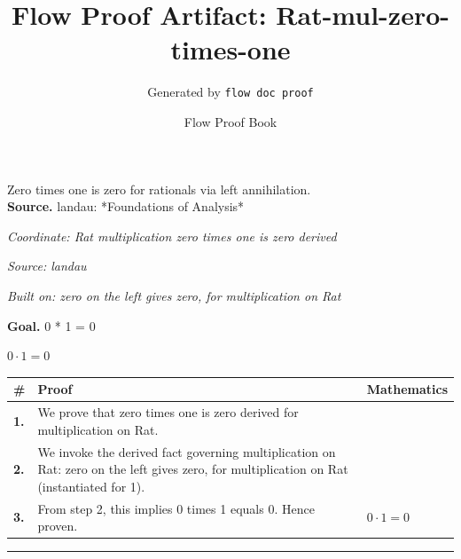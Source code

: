 \documentclass[11pt]{article}
\title{Flow Proof Artifact: Rat-mul-zero-times-one}
\author{Generated by \texttt{flow doc proof}}
\date{Flow Proof Book}
\theoremstyle{definition}
\begin{document}
\maketitle
Zero times one is zero for rationals via left annihilation.\\[0.5em]
\textbf{Source.} landau: *Foundations of Analysis*\\[0.5em]
\bigskip
{}\par
\smallskip\noindent\textit{Coordinate: Rat \cdot multiplication \cdot zero times one is zero derived}\par
\smallskip\noindent\textit{Source: landau}\par
\smallskip\noindent\textit{Built on: zero on the left gives zero, for multiplication on Rat}\par
\medskip
\noindent\textbf{Goal.} 0 * 1 = 0\par
\noindent$\displaystyle 0 \cdot 1 = 0$\par
\medskip
\noindent
\begin{tabular}{@{} >{\raggedright\arraybackslash}p{} >{\raggedright\arraybackslash}p{} >{\raggedleft\arraybackslash}p{} @{}}
\textbf{\#} & \textbf{Proof} & \textbf{Mathematics} \\
\midrule
\textbf{1.} & We prove that zero times one is zero derived for multiplication on Rat. & \\[0.45em]
\textbf{2.} & We invoke the derived fact governing multiplication on Rat: zero on the left gives zero, for multiplication on Rat (instantiated for 1). & \\[0.45em]
\textbf{3.} & From step 2, this implies 0 times 1 equals 0. Hence proven. & $\displaystyle 0 \cdot 1 = 0$ \\[0.45em]
\bottomrule
\end{tabular}
\label{thm:Rat-multiplication-zero_times_one_is_zero_derived}
\par\medskip\hrule
\end{document}
